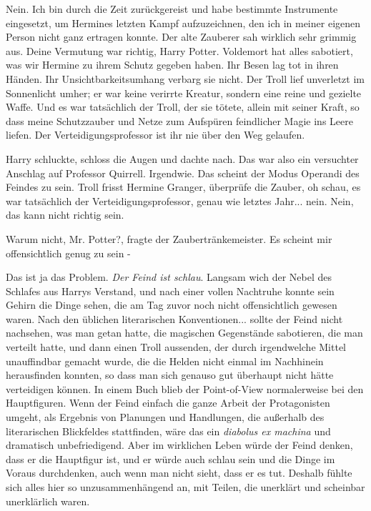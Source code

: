 \glqq{}Nein. Ich bin durch die Zeit zurückgereist und habe bestimmte Instrumente
eingesetzt, um Hermines letzten Kampf aufzuzeichnen, den ich in meiner eigenen
Person nicht ganz ertragen konnte.\grqq{} Der alte Zauberer sah wirklich sehr
grimmig aus. \glqq{}Deine Vermutung war richtig, Harry Potter. Voldemort hat
alles sabotiert, was wir Hermine zu ihrem Schutz gegeben haben. Ihr Besen lag
tot in ihren Händen. Ihr Unsichtbarkeitsumhang verbarg sie nicht. Der Troll lief
unverletzt im Sonnenlicht umher; er war keine verirrte Kreatur, sondern eine
reine und gezielte Waffe. Und es war tatsächlich der Troll, der sie tötete,
allein mit seiner Kraft, so dass meine Schutzzauber und Netze zum Aufspüren
feindlicher Magie ins Leere liefen. Der Verteidigungsprofessor ist ihr nie über
den Weg gelaufen.\grqq{}

Harry schluckte, schloss die Augen und dachte nach. \glqq{}Das war also ein
versuchter Anschlag auf Professor Quirrell. Irgendwie. Das scheint der Modus
Operandi des Feindes zu sein. Troll frisst Hermine Granger, überprüfe die
Zauber, oh schau, es war tatsächlich der Verteidigungsprofessor, genau wie
letztes Jahr... nein. Nein, das kann nicht richtig sein.\grqq{}

\glqq{}Warum nicht, Mr. Potter?\grqq{}, fragte der Zaubertränkemeister. \glqq{}Es
scheint mir offensichtlich genug zu sein -\grqq{}

\glqq{}Das ist ja das Problem.\grqq{} \emph{Der Feind ist schlau}. Langsam wich
der Nebel des Schlafes aus Harrys Verstand, und nach einer vollen Nachtruhe
konnte sein Gehirn die Dinge sehen, die am Tag zuvor noch nicht offensichtlich
gewesen waren. Nach den üblichen literarischen Konventionen... sollte der Feind
nicht nachsehen, was man getan hatte, die magischen Gegenstände sabotieren, die
man verteilt hatte, und dann einen Troll aussenden, der durch irgendwelche
Mittel unauffindbar gemacht wurde, die die Helden nicht einmal im Nachhinein
herausfinden konnten, so dass man sich genauso gut überhaupt nicht hätte
verteidigen können. In einem Buch blieb der Point-of-View normalerweise bei den
Hauptfiguren. Wenn der Feind einfach die ganze Arbeit der Protagonisten umgeht,
als Ergebnis von Planungen und Handlungen, die außerhalb des literarischen
Blickfeldes stattfinden, wäre das ein \emph{diabolus ex machina} und dramatisch
unbefriedigend. Aber im wirklichen Leben würde der Feind denken, dass er die
Hauptfigur ist, und er würde auch schlau sein und die Dinge im Voraus
durchdenken, auch wenn man nicht sieht, dass er es tut. Deshalb fühlte sich
alles hier so unzusammenhängend an, mit Teilen, die unerklärt und scheinbar
unerklärlich waren.

